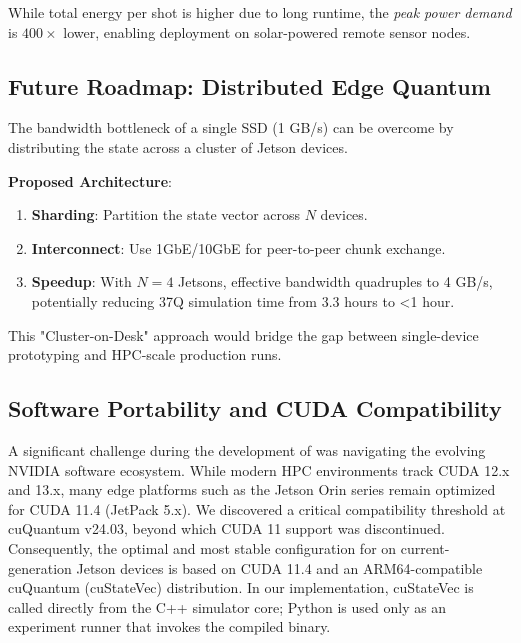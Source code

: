 While total energy per shot is higher due to long runtime, the \textit{peak power demand} is $400\times$ lower, enabling deployment on solar-powered remote sensor nodes.

\subsection{Future Roadmap: Distributed Edge Quantum}

The bandwidth bottleneck of a single SSD (1 GB/s) can be overcome by distributing the state across a cluster of Jetson devices.

\textbf{Proposed Architecture}:
\begin{enumerate}
    \item \textbf{Sharding}: Partition the state vector across $N$ devices.
    \item \textbf{Interconnect}: Use 1GbE/10GbE for peer-to-peer chunk exchange.
    \item \textbf{Speedup}: With $N=4$ Jetsons, effective bandwidth quadruples to 4 GB/s, potentially reducing 37Q simulation time from 3.3 hours to <1 hour.
\end{enumerate}

This "Cluster-on-Desk" approach would bridge the gap between single-device prototyping and HPC-scale production runs.

\subsection{Software Portability and CUDA Compatibility}

A significant challenge during the development of \EdgeQuantum was navigating the evolving NVIDIA software ecosystem. While modern HPC environments track CUDA 12.x and 13.x, many edge platforms such as the Jetson Orin series remain optimized for CUDA 11.4 (JetPack 5.x). We discovered a critical compatibility threshold at cuQuantum v24.03, beyond which CUDA 11 support was discontinued. Consequently, the optimal and most stable configuration for \EdgeQuantum on current-generation Jetson devices is based on CUDA 11.4 and an ARM64-compatible cuQuantum (cuStateVec) distribution. In our implementation, cuStateVec is called directly from the C++ simulator core; Python is used only as an experiment runner that invokes the compiled binary.
